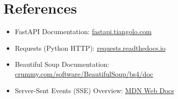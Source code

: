 \documentclass[11pt,a4paper]{article}
\begin{document}
\section{References}
\begin{itemize}
  \item FastAPI Documentation: \href{https://fastapi.tiangolo.com/}{fastapi.tiangolo.com}
  \item Requests (Python HTTP): \href{https://requests.readthedocs.io/}{requests.readthedocs.io}
  \item Beautiful Soup Documentation: \href{https://www.crummy.com/software/BeautifulSoup/bs4/doc/}{crummy.com/software/BeautifulSoup/bs4/doc}
  \item Server-Sent Events (SSE) Overview: \href{https://developer.mozilla.org/en-US/docs/Web/API/Server-sent_events}{MDN Web Docs}
\end{itemize}
\end{document}

